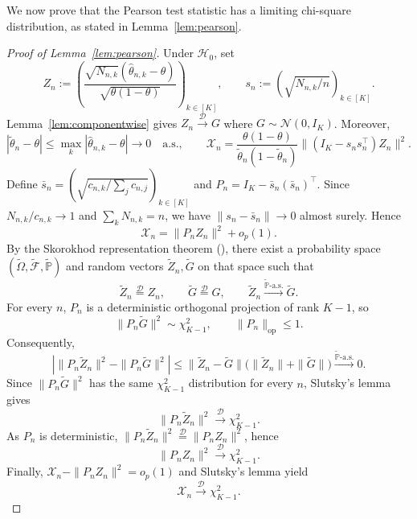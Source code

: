 {\color{revisiongreen}
We now prove that the Pearson test statistic has a limiting chi-square distribution, as stated in Lemma~\ref{lem:pearson}.

\begin{proof}[Proof of Lemma~\ref{lem:pearson}]
Under \(\mathcal H_0\), set
\[
Z_n:=\left(\frac{\sqrt{N_{n,k}}(\hat\theta_{n,k}-\theta)}{\sqrt{\theta(1-\theta)}}\right)_{k\in[K]},
\qquad s_n:=\left(\sqrt{N_{n,k}/n}\right)_{k\in[K]}.
\]
Lemma~\ref{lem:componentwise} gives \(Z_n\xrightarrow{\mathcal D}G\) where \(G \sim \mathcal N(0,I_K)\). Moreover,
\[
|\tilde\theta_n-\theta|\leq\max_k|\hat\theta_{n,k}-\theta|\to0\quad\text{a.s.},
\qquad
\mathcal X_n=\frac{\theta(1-\theta)}{\tilde\theta_n(1-\tilde\theta_n)}
\|(I_K-s_ns_n^\top)Z_n\|^2.
\]
Define \(\bar s_n=(\sqrt{c_{n,k}/\sum_jc_{n,j}})_{k\in[K]}\) and \(P_n=I_K-\bar s_n(\bar s_n)^\top\). Since \(N_{n,k}/c_{n,k}\to1\) and \(\sum_kN_{n,k}=n\), we have \(\|s_n-\bar s_n\|\to0\) almost surely. Hence
\[
\mathcal X_n=\|P_nZ_n\|^2+o_p(1).
\]
By the Skorokhod representation theorem (\citealp[Theorem~6.7]{billingsley1999convergence}), there exist a probability space \((\widetilde\Omega,\widetilde{\mathcal F},\widetilde{\mathbb P})\) and random vectors \(\widetilde Z_n,\widetilde G\) on that space such that
\[
\widetilde Z_n\stackrel{\mathcal D}=Z_n,
\qquad
\widetilde G\stackrel{\mathcal D}=G,
\qquad
\widetilde Z_n\xrightarrow{\widetilde{\mathbb P}\text{-a.s.}}\widetilde G.
\]
For every \(n\), \(P_n\) is a deterministic orthogonal projection of rank \(K-1\), so
\[
\|P_n\widetilde G\|^2\sim\chi^2_{K-1},
\qquad
\|P_n\|_{\mathrm{op}}\leq1.
\]
Consequently,
\[
\left|\|P_n\widetilde Z_n\|^2-\|P_n\widetilde G\|^2\right|
\leq\|\widetilde Z_n-\widetilde G\|
\bigl(\|\widetilde Z_n\|+\|\widetilde G\|\bigr)
\xrightarrow{\widetilde{\mathbb P}\text{-a.s.}}0.
\]
Since \(\|P_n\widetilde G\|^2\) has the same \(\chi^2_{K-1}\) distribution for every \(n\), Slutsky's lemma gives
\[
\|P_n\widetilde Z_n\|^2\xrightarrow{\mathcal D}\chi^2_{K-1}.
\]
As \(P_n\) is deterministic, \(\|P_n\widetilde Z_n\|^2\stackrel{\mathcal D}=\|P_nZ_n\|^2\), hence
\[
\|P_nZ_n\|^2\xrightarrow{\mathcal D}\chi^2_{K-1}.
\]
Finally, \(\mathcal X_n-\|P_nZ_n\|^2=o_p(1)\) and Slutsky's lemma yield
\[
\mathcal X_n\xrightarrow{\mathcal D}\chi^2_{K-1}.
\]
\end{proof}
}


